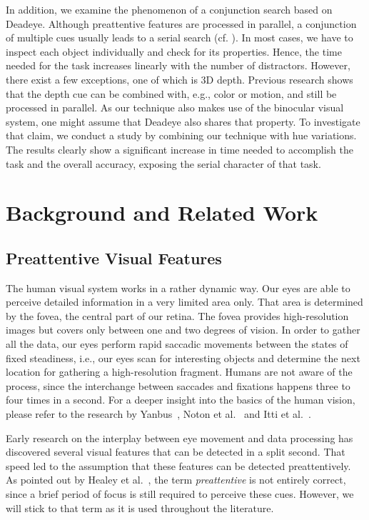 \documentclass[journal]{vgtc}                %
\begin{document}
In addition, we examine the phenomenon of a conjunction search based on Deadeye. Although preattentive features are processed in parallel, a conjunction of multiple cues usually leads to a serial search (cf. ). In most cases, we have to inspect each object individually and check for its properties. Hence, the time needed for the task increases linearly with the number of distractors. However, there exist a few exceptions, one of which is 3D depth. Previous research shows that the depth cue can be combined with, e.g., color or motion, and still be processed in parallel. As our technique also makes use of the binocular visual system, one might assume that Deadeye also shares that property. To investigate that claim, we conduct a study by combining our technique with hue variations. The results clearly show a significant increase in time needed to accomplish the task and the overall accuracy, exposing the serial character of that task.



\section{Background and Related Work}



\subsection{Preattentive Visual Features}

The human visual system works in a rather dynamic way. Our eyes are able to perceive detailed information in a very limited area only. That area is determined by the fovea, the central part of our retina. The fovea provides high-resolution images but covers only between one and two degrees of vision. In order to gather all the data, our eyes perform rapid saccadic movements between the states of fixed steadiness, i.e., our eyes scan for interesting objects and determine the next location for gathering a high-resolution fragment. Humans are not aware of the process, since the interchange between saccades and fixations happens three to four times in a second. For a deeper insight into the basics of the human vision, please refer to the research by Yanbus~\cite{Yarbus1967, yarbus1967eye}, Noton et al.~\cite{NOTON1971929} and Itti et al.~\cite{itti2001computational}.

Early research on the interplay between eye movement and data processing has discovered several visual features that can be detected in a split second. That speed led to the assumption that these features can be detected preattentively. As pointed out by Healey et al.~\cite{Healey:2012:AVM:2225054.2225226}, the term \textit{preattentive} is not entirely correct, since a brief period of focus is still required to perceive these cues. However, we will stick to that term as it is used throughout the literature.
\end{document}
